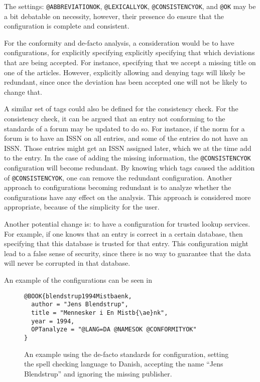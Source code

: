 The settings: \texttt{@ABBREVIATIONOK}, \texttt{@LEXICALLYOK},
\texttt{@CONSISTENCYOK}, and \texttt{@OK} may be a bit debatable on
necessity, however, their presence do ensure that the configuration is
complete and consistent.

For the conformity and de-facto analysis, a consideration would be to
have configurations, for explicitly specifying explicitly specifying
that which deviations that are being accepted.  For instance,
specifying that we accept a missing title on one of the articles.
However, explicitly allowing and denying tags will likely be
redundant, since once the deviation has been accepted one will not be
likely to change that.

A similar set of tags could also be defined for the consistency check.
For the consistency check, it can be argued that an entry not
conforming to the standards of a forum may be updated to do so.  For
instance, if the norm for a forum is to have an ISSN on all entries,
and some of the entries do not have an ISSN.  Those entries might get
an ISSN assigned later, which we at the time add to the entry.  In the
case of adding the missing information, the \texttt{@CONSISTENCYOK}
configuration will become redundant.  By knowing which tags caused the
addition of \texttt{@CONSISTENCYOK}, one can remove the redundant
configuration.  Another approach to configurations becoming redundant
is to analyze whether the configurations have any effect on the
analysis.  This approach is considered more appropriate, because of
the simplicity for the user.

Another potential change is: to have a configuration for trusted
lookup services.  For example, if one knows that an entry is correct
in a certain database, then specifying that this database is trusted
for that entry.  This configuration might lead to a false sense of
security, since there is no way to guarantee that the data will never
be corrupted in that database.

An example of the configurations can be seen in

\begin{figure}
  \centering
\begin{verbatim}
@BOOK{blendstrup1994Mistbaenk,
  author = "Jens Blendstrup",
  title = "Mennesker i En Mistb{\ae}nk",
  year = 1994,
  OPTanalyze = "@LANG=DA @NAMESOK @CONFORMITYOK"
}
\end{verbatim}
  \caption{An example using the de-facto standards for configuration,
    setting the spell checking language to Danish, accepting the name
    ``Jens Blendstrup'' and ignoring the missing publisher.}
  \label{fig:analyzing_added_de_facto_standards}
\end{figure}

